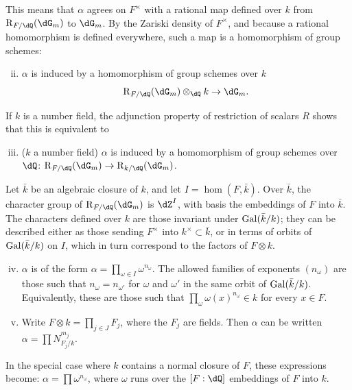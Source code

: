 This means that $\alpha$ agrees on $F^\times$ with a rational map defined over $k$ 
from $\res_{F/\dQ}(\dG_m)$ to $\dG_m$. By the Zariski density of 
$F^\times$, and because a rational homomorphism is defined everywhere, such 
a map is a homomorphism of group schemes: 
\begin{enumerate}[(i)]
\setcounter{enumi}{1}
  \item $\alpha$ is induced by a homomorphism of group schemes over $k$ 
    \[
      \res_{F/\dQ}(\dG_m)\otimes_\dQ k \to \dG_m \text{.} 
    \] 
\end{enumerate}

If $k$ is a number field, the adjunction property of restriction of 
scalars $R$ shows that this is equivalent to 
\begin{enumerate}[(i)]
\setcounter{enumi}{2}
  \item ($k$ a number field) $\alpha$ is induced by a homomorphism of 
    group schemes over $\dQ$: $\res_{F/\dQ}(\dG_m) \to \res_{k/\dQ}(\dG_m)$. 
\end{enumerate}

Let $\bar k$ be an algebraic closure of $k$, and let $I=\hom(F,\bar k)$. Over 
$\bar k$, the character group of $\res_{F/\dQ}(\dG_m)$ is $\dZ^I$, with basis 
the embeddings of $F$ into $\bar k$. The characters defined over $k$ 
are those invariant under $\operatorname{Gal}(\bar k/k)$; they can be described either as 
those sending $F^\times$ into $k^\times\subset \bar k$, or in terms of 
orbits of $\operatorname{Gal}(\bar k/k)$ on $I$, which in turn correspond to the factors of 
$F\otimes k$. 
\begin{enumerate}[(i)]
\setcounter{enumi}{3}
  \item $\alpha$ is of the form 
    $\alpha=\prod_{\omega\in I} \omega^{n_\omega}$. The allowed families of exponents 
    $(n_\omega)$ are those such that $n_\omega=n_{\omega'}$ for 
    $\omega$ and $\omega'$ in the same orbit of $\operatorname{Gal}(\bar k/k)$. Equivalently, these 
    are those such that $\prod_\omega \omega(x)^{n_\omega}\in k$ for every 
    $x\in F$. 
  \item Write $F\otimes k=\prod_{j\in J} F_j$, where the $F_j$ are fields. 
    Then $\alpha$ can be written $\alpha=\prod N_{F_j/k}^{m_j}$. 
\end{enumerate}

In the special case where $k$ contains a normal closure of $F$, these 
expressions become: $\alpha=\prod \omega^{n_\omega}$, where $\omega$ 
runs over the $[F:\dQ]$ embeddings of $F$ into $k$. 





